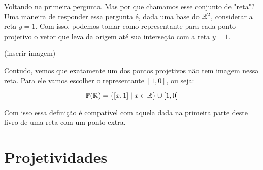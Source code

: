Voltando na primeira pergunta. Mas por que chamamos esse conjunto de "reta"? Uma maneira de responder essa pergunta é, dada uma base do $\mathbb{R}^2$, considerar a reta $y=1$. Com isso, podemos tomar como representante para cada ponto projetivo o vetor que leva da origem até sua interseção  com a reta $y=1$.

(inserir imagem)

Contudo, vemos que exatamente um dos pontos projetivos não tem imagem nessa reta. Para ele vamos escolher o representante $[1,0]$, ou seja:

$$\mathbb{P}(\mathbb{R})=\{[x,1]\mid x\in \mathbb{R}\}\cup {[1,0]}$$


Com isso essa definição é compatível com aquela dada na primeira parte deste livro de uma reta com um ponto extra.

\section{Projetividades}